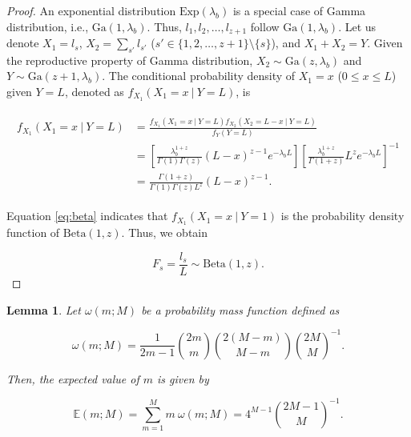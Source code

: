 \documentclass[11pt, class=article, crop=false]{standalone}
\newtheorem{lemma}{Lemma}[subsection]
\theoremstyle{definition}
\begin{document}
\begin{proof}
An exponential distribution $\mbox{Exp}(\lambda_b)$ is a special case of Gamma distribution, i.e., $\mbox{Ga}(1, \lambda_b)$.
Thus, $l_1, l_2, \ldots, l_{z+1}$  follow $\mbox{Ga}(1, \lambda_b)$.
Let us denote $X_1 = l_s$, $X_2 = \sum_{s'} l_{s'}$ ($s' \in \{1,2, \ldots, z+1\} \setminus \{s\}$), and $X_1 + X_2 = Y$.
Given the reproductive property of Gamma distribution, $X_2 \sim \mbox{Ga}(z, \lambda_b)$ and $Y \sim \mbox{Ga}(z + 1, \lambda_b)$.
The conditional probability density of $X_1 = x$ ($0 \le x \le L$) given $Y = L$, denoted as $f_{X_1}(X_1 = x~|~Y = L)$, is

\begin{align}
    \begin{split}
        f_{X_1}(X_1 = x~|~Y = L)
        &= \frac{f_{X_1}(X_1 = x~|~Y = L) f_{X_2}(X_2 = L - x~|~Y = L)}{f_Y(Y = L)}\\
        &= 
        \left[
        \frac{\lambda_b^{1 + z}}{\Gamma(1) \Gamma(z)} (L - x)^{z - 1} e^{-\lambda_b L}
        \right]
        \left[
        \frac{\lambda_b^{1 + z}}{\Gamma(1 + z)} L^{z} e^{-\lambda_b L}
        \right]^{-1}\\
        &= \frac{\Gamma(1 + z)}{\Gamma(1) \Gamma(z) L^{z}} (L - x)^{z - 1}.
    \end{split}
    \label{eq:beta}
\end{align}

Equation \ref{eq:beta} indicates that $f_{X_1}(X_1 = x~|~Y = 1)$ is the probability density function of $\mbox{Beta}(1, z)$.
Thus, we obtain

\begin{equation}
    F_s=\frac{l_s}{L} \sim \mbox{Beta} (1, z).
\end{equation}

\end{proof}

\begin{lemma}
\label{lemma-m}
Let $\omega(m; M)$ be a probability mass function defined as

\begin{equation}
    \omega(m; M) = \frac{1}{2m - 1} \binom{2m}{m} \binom{2(M - m)}{M - m} \binom{2M}{M}^{-1}.
\end{equation}

Then, the expected value of $m$ is given by

\begin{equation}
    \mathbb{E}(m; M) = \sum_{m = 1}^M m~\omega(m; M) = 4^{M-1} \binom{2M-1}{M}^{-1}.
\end{equation}
\end{lemma}
\end{document}

